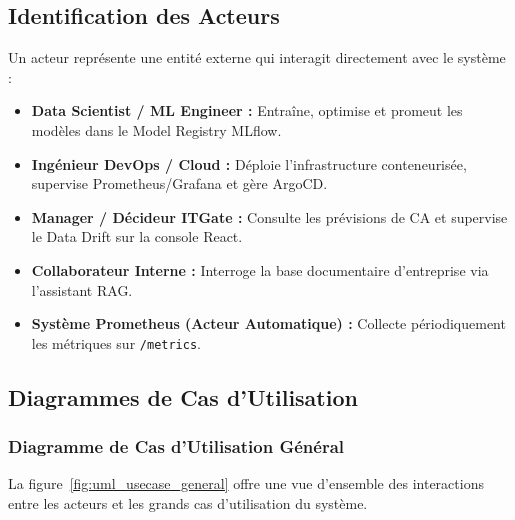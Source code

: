 \documentclass[11pt,a4paper,oneside]{report}
\begin{document}
\subsection{Identification des Acteurs}
Un acteur représente une entité externe qui interagit directement avec le système :
\begin{itemize}[leftmargin=0.8cm, itemsep=0.5pt, topsep=1pt]
    \item \textbf{Data Scientist / ML Engineer :} Entraîne, optimise et promeut les modèles dans le Model Registry MLflow.
    \item \textbf{Ingénieur DevOps / Cloud :} Déploie l'infrastructure conteneurisée, supervise Prometheus/Grafana et gère ArgoCD.
    \item \textbf{Manager / Décideur ITGate :} Consulte les prévisions de CA et supervise le Data Drift sur la console React.
    \item \textbf{Collaborateur Interne :} Interroge la base documentaire d'entreprise via l'assistant RAG.
    \item \textbf{Système Prometheus (Acteur Automatique) :} Collecte périodiquement les métriques sur \texttt{/metrics}.
\end{itemize}

\subsection{Diagrammes de Cas d'Utilisation}

\subsubsection{Diagramme de Cas d'Utilisation Général}
La figure~\ref{fig:uml_usecase_general} offre une vue d'ensemble des interactions entre les acteurs et les grands cas d'utilisation du système.
\end{document}
